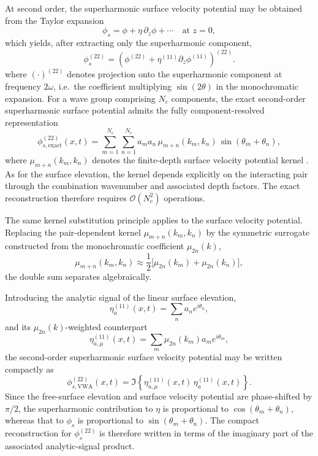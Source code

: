 \documentclass[lineno]{JFM-FLM_Au}
\begin{document}
At second order, the superharmonic surface velocity potential may be obtained from the Taylor expansion
\[
\phi_s
=
\phi + \eta\,\partial_z \phi + \cdots
\quad \text{at } z=0,
\]
which yields, after extracting only the superharmonic component,
\begin{equation}
\phi_s^{(22)}
=
\left(
\phi^{(22)}
+
\eta^{(11)}\partial_z\phi^{(11)}
\right)^{(22)}.
\end{equation}
where $(\cdot)^{(22)}$ denotes projection onto the superharmonic component at frequency $2\omega$, i.e.\ the coefficient multiplying $\sin(2\theta)$ in the monochromatic expansion.
For a wave group comprising $N_c$ components, the exact second-order superharmonic surface potential admits the fully component-resolved representation
\begin{equation}\label{method:phis22_exact_clean}
\phi^{(22)}_{s,\mathrm{exact}}(x,t)
=
\sum_{m=1}^{N_c}\sum_{n=1}^{N_c}
a_m a_n\,
\mu_{m+n}(k_m,k_n)\,
\sin(\theta_m+\theta_n),
\end{equation}
where $\mu_{m+n}(k_m,k_n)$ denotes the finite-depth surface velocity potential kernel \citep{madsen2012third}.
As for the surface elevation, the kernel depends explicitly on the interacting pair through the combination wavenumber and associated depth factors.
The exact reconstruction therefore requires $\mathcal{O}(N_c^2)$ operations.

The same kernel substitution principle applies to the surface velocity potential.
Replacing the pair-dependent kernel $\mu_{m+n}(k_m,k_n)$ by the symmetric surrogate constructed from the monochromatic coefficient $\mu_{2n}(k)$,
\begin{equation}
\mu_{m+n}(k_m,k_n)
\approx
\frac12\Big[
\mu_{2n}(k_m)
+
\mu_{2n}(k_n)
\Big],
\end{equation}
the double sum separates algebraically.

Introducing the analytic signal of the linear surface elevation,
\[
\eta_a^{(11)}(x,t)
=
\sum_n a_n e^{i\theta_n},
\]
and its $\mu_{2n}(k)$-weighted counterpart
\[
\eta_{a,\mu}^{(11)}(x,t)
=
\sum_m \mu_{2n}(k_m)a_m e^{i\theta_m},
\]
the second-order superharmonic surface velocity potential may be written compactly as
\begin{equation}\label{method:phis22_VWA_final}
\phi^{(22)}_{s,\mathrm{VWA}}(x,t)
=
\Im\left\{
\eta_{a,\mu}^{(11)}(x,t)\,
\eta_a^{(11)}(x,t)
\right\}.
\end{equation}
Since the free-surface elevation and surface velocity potential are phase-shifted by $\pi/2$, the superharmonic contribution to $\eta$ is proportional to $\cos(\theta_m+\theta_n)$, whereas that to $\phi_s$ is proportional to $\sin(\theta_m+\theta_n)$. The compact reconstruction for $\phi_s^{(22)}$ is therefore written in terms of the imaginary part of the associated analytic-signal product.
\end{document}
